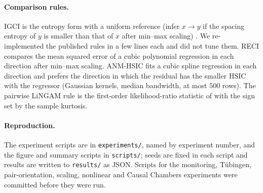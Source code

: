 \paragraph{Comparison rules.} IGCI is the entropy form with a uniform reference
(infer $x\to y$ if the spacing entropy of $y$ is smaller than that of $x$ after
min--max scaling) \citep{daniusis2010inferring}. We re-implemented the published
rules in a few lines each and did not tune them. RECI \citep{blobaum2018cause} compares the
mean squared error of a cubic polynomial regression in each direction after
min--max scaling. ANM-HSIC fits a cubic spline regression in each direction and
prefers the direction in which the residual has the smaller HSIC with the
regressor (Gaussian kernels, median bandwidth, at most $500$ rows). The pairwise
LiNGAM rule is the first-order likelihood-ratio statistic of
\citet{hyvarinen2013pairwise} with the sign set by the sample kurtosis.

\paragraph{Reproduction.} The experiment scripts are in \texttt{experiments/},
named by experiment number, and the figure and summary scripts in \texttt{scripts/};
seeds are fixed in each script and results are written to \texttt{results/} as JSON.
Scripts for the monitoring, Tübingen, pair-orientation, scaling, nonlinear and
Causal Chambers experiments were committed before they were run.
